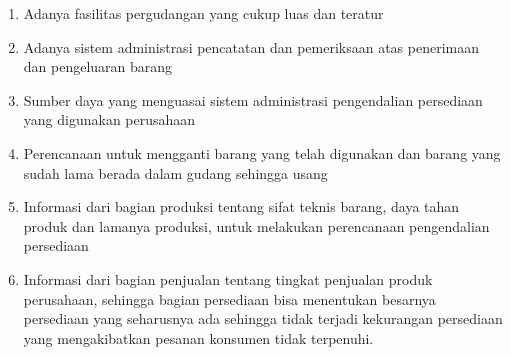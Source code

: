 \begin{enumerate}
	\item Adanya fasilitas pergudangan yang cukup luas dan teratur
	\item Adanya sistem administrasi pencatatan dan pemeriksaan atas penerimaan dan pengeluaran barang
	\item Sumber daya yang menguasai sistem administrasi pengendalian persediaan yang digunakan perusahaan
	\item Perencanaan untuk mengganti barang yang telah digunakan dan barang yang sudah lama berada dalam gudang sehingga usang
	\item Informasi dari bagian produksi tentang sifat teknis barang, daya tahan produk dan lamanya produksi, untuk melakukan perencanaan pengendalian persediaan
	\item Informasi dari bagian penjualan tentang tingkat penjualan produk perusahaan, sehingga bagian persediaan bisa menentukan besarnya persediaan yang seharusnya ada sehingga tidak terjadi kekurangan persediaan yang mengakibatkan pesanan konsumen tidak terpenuhi.
\end{enumerate}